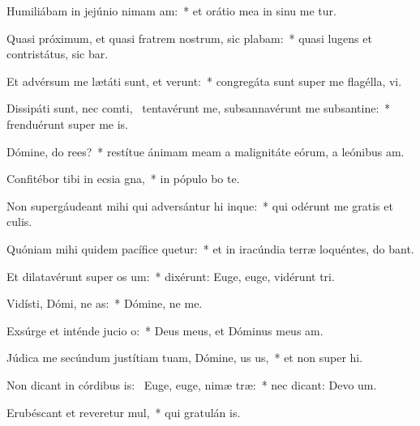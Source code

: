 \item Humiliábam in jejúnio nimam am:~* et orátio mea in sinu me tur.
\item Quasi próximum, et quasi fratrem nostrum, sic plabam:~* quasi lugens et contristátus, sic bar.
\item Et advérsum me lætáti sunt, et verunt:~* congregáta sunt super me flagélla,  vi.
\item Dissipáti sunt, nec comti,~\pscross{} tentavérunt me, subsannavérunt me subsantine:~* frenduérunt super me  is.
\item Dómine, do rees?~* restítue ánimam meam a malignitáte eórum, a leónibus  am.
\item Confitébor tibi in ecsia gna,~* in pópulo  bo te.
\item Non supergáudeant mihi qui adversántur hi inque:~* qui odérunt me gratis et  culis.
\item Quóniam mihi quidem pacífice quetur:~* et in iracúndia terræ loquéntes, do bant.
\item Et dilatavérunt super  os um:~* dixérunt: Euge, euge, vidérunt  tri.
\item Vidísti, Dómi, ne as:~* Dómine, ne   me.
\item Exsúrge et inténde jucio o:~* Deus meus, et Dóminus meus   am.
\item Júdica me secúndum justítiam tuam, Dómine, us us,~* et non super hi.
\item Non dicant in córdibus is:~\pscross{} Euge, euge, nimæ træ:~* nec dicant: Devo um.
\item Erubéscant et reveretur mul,~* qui gratulán  is.
